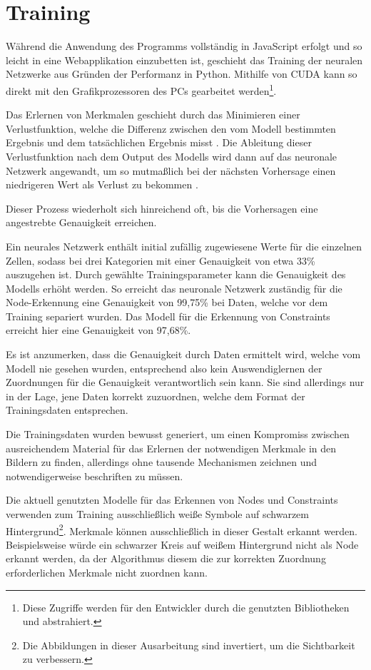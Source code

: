 \section{Training}
Während die Anwendung des Programms vollständig in JavaScript erfolgt und so leicht in eine Webapplikation einzubetten ist, geschieht das Training der neuralen Netzwerke aus Gründen der Performanz in Python.
Mithilfe von CUDA \cite{nvidia2019} kann so direkt mit den Grafikprozessoren des PCs gearbeitet werden\footnote{Diese Zugriffe werden für den Entwickler durch die genutzten Bibliotheken  und  abstrahiert.}.

Das Erlernen von Merkmalen geschieht durch das Minimieren einer Verlustfunktion, welche die Differenz zwischen den vom Modell bestimmten Ergebnis und dem tatsächlichen Ergebnis misst \cite[S.710]{StuartRussell2018}.
Die Ableitung dieser Verlustfunktion nach dem Output des Modells wird dann auf das neuronale Netzwerk angewandt, um so mutma{\ss}lich bei der nächsten Vorhersage einen niedrigeren Wert als Verlust zu bekommen \cite[S.719]{StuartRussell2018}.

Dieser Prozess wiederholt sich hinreichend oft, bis die Vorhersagen eine angestrebte Genauigkeit erreichen.

Ein neurales Netzwerk enthält initial zufällig zugewiesene Werte für die einzelnen Zellen, sodass bei drei Kategorien mit einer Genauigkeit von etwa 33\% auszugehen ist.
Durch gewählte Trainingsparameter kann die Genauigkeit des Modells erhöht werden.
So erreicht das neuronale Netzwerk zuständig für die Node-Erkennung eine Genauigkeit von 99,75\% bei Daten, welche vor dem Training separiert wurden.
Das Modell für die Erkennung von Constraints erreicht hier eine Genauigkeit von 97,68\%.

Es ist anzumerken, dass die Genauigkeit durch Daten ermittelt wird, welche vom Modell nie gesehen wurden, entsprechend also kein Auswendiglernen der Zuordnungen \cite[S.705]{StuartRussell2018} für die Genauigkeit verantwortlich sein kann.
Sie sind allerdings nur in der Lage, jene Daten korrekt zuzuordnen, welche dem Format der Trainingsdaten entsprechen.

Die Trainingsdaten wurden bewusst generiert, um einen Kompromiss zwischen ausreichendem Material für das Erlernen der notwendigen Merkmale in den Bildern zu finden, allerdings ohne tausende Mechanismen zeichnen und notwendigerweise beschriften zu müssen.

Die aktuell genutzten Modelle für das Erkennen von Nodes und Constraints verwenden zum Training ausschlie{\ss}lich wei{\ss}e Symbole auf schwarzem Hintergrund\footnote{Die Abbildungen in dieser Ausarbeitung sind invertiert, um die Sichtbarkeit zu verbessern.}.
Merkmale können ausschlie{\ss}lich in dieser Gestalt erkannt werden. Beispielsweise würde ein schwarzer Kreis auf wei{\ss}em Hintergrund nicht als Node erkannt werden, da der Algorithmus diesem die zur korrekten Zuordnung erforderlichen Merkmale nicht zuordnen kann.
